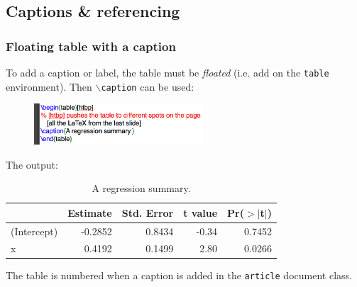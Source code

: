 \documentclass[slidestop,compress,mathserif]{beamer}
\begin{document}
\subsection[Captions \& referencing]{Captions \& referencing}
\begin{frame} \frametitle{Floating table with a caption}
	To add a caption or label, the table must be \emph{floated} (i.e. add on the \texttt{\color{highlight}table} environment). Then \texttt{\color{command}$\backslash$caption} can be used:
	\begin{figure}[htbp]
		\centering
		\includegraphics[height=0.6in]{basicsOfLatex/tabTable/floatTable}
	\end{figure}
	The output:
	\begin{table}[htbp]
		\begin{center} %
			\begin{tabular}{l | rrrr} %
				\hline %
				& Estimate & Std. Error & t value & Pr($>$$|$t$|$) \\
				\hline
				(Intercept) & -0.2852   & 0.8434     & -0.34    & 0.7452 \\
				x                & 0.4192    & 0.1499     & 2.80     & 0.0266 \\
				\hline
			\end{tabular}
		\end{center}
		\caption{A regression summary.}
	\end{table}
	The table is numbered when a caption is added in the \texttt{\color{highlight}article} document class.
\end{frame}
\end{document}
